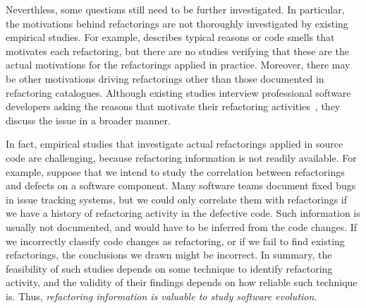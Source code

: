 Neverthless, some questions still need to be further investigated.
In particular, the motivations behind refactorings are not thoroughly investigated by existing empirical studies.
For example, \cite{Fowler:1999} describes typical reasons or code smells that motivates each refactoring, but there are no studies verifying that these are the actual motivations for the refactorings applied in practice.
Moreover, there may be other motivations driving refactorings other than those  documented in refactoring catalogues.
Although existing studies interview professional software developers asking the reasons that motivate their refactoring activities~\citep{kim-tse-2014, Wang:2009}, they discuss the issue in a broader manner.

In fact, empirical studies that investigate actual refactorings applied in source code are challenging, because refactoring information is not readily available.
For example, suppose that we intend to study the correlation between refactorings and defects on a software component. 
Many software teams document fixed bugs in issue tracking systems, but we could only correlate them with refactorings if we have a history of refactoring activity in the defective code.
Such information is usually not documented, and would have to be inferred from the code changes.
If we incorrectly classify code changes as refactoring, or if we fail to find existing refactorings, the conclusions we drawn might be incorrect.
In summary, the feasibility of such studies depends on some technique to identify refactoring activity, and the validity of their findings depends on how reliable such technique is.
Thus, \emph{refactoring information is valuable to study software evolution}.

